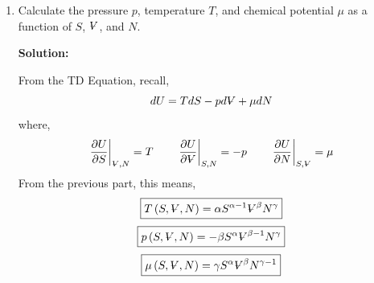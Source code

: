 \documentclass[10pt]{article}
\newenvironment{Solution}
    {\textbf{Solution:}
    
    \vspace{5mm}
    \begin{tcolorbox}
    }
    {
    \end{tcolorbox}
    \vspace{5mm}
    }
\newcommand{\vol}{{\ooalign{\hfil$V$\hfil\cr\kern0.08em--\hfil\cr}}}
\begin{document}
\begin{enumerate}
\begin{enumerate}
\begin{Solution}
    \begin{align}
    \frac{\partial U(S, \vol, N)}{\partial S}  &=  \alpha S^{\alpha-1} \vol^\beta N^\gamma \\
    \frac{\partial U(S, \vol, N)}{\partial \vol} &=  \beta S^{\alpha} \vol^{\beta-1} N^\gamma \\
    \frac{\partial U(S, \vol, N)}{\partial N} &= \gamma S^{\alpha} \vol^{\beta} N^{\gamma-1}
    \end{align}
    Substituting these back into \ref{extensive} we get,
    \begin{align}
    U(S, \vol, N)&= \alpha S^\alpha \vol^\beta N^\gamma  + \beta S^\alpha \vol^\beta N^\gamma  + \gamma S^\alpha \vol^\beta N^\gamma \\
    &=\left(\alpha + \beta + \gamma\right) S^\alpha \vol^\beta N^\gamma 
    \end{align}
    Form the problem statement, we know that $U \left(S,\vol,N\right) = {\left(S^\alpha \vol^\beta N^\gamma \right)}$ so,
    \begin{equation}
        \boxed{
        \left(\alpha + \beta + \gamma\right) = 1
        }
    \end{equation}
    \end{Solution}
    \item Calculate the pressure $p$, temperature 
    $T$, and chemical potential $\mu$ as a function of $S$, $\vol$, and $N$.
    
    \begin{Solution}
    From the TD Equation, recall, 
    \begin{equation}
        dU = T dS - p d\vol + \mu dN
    \end{equation}
    where, 
    \begin{equation}
        \left.\frac{\partial U}{\partial S}\right|_{\scriptsize{\vol}, N} = T \qquad \left.\frac{\partial U}{\partial \vol}\right|_{S, N} = -p \qquad \left.\frac{\partial U}{\partial N}\right|_{\scriptsize{S,\vol}} = \mu  
    \end{equation}
    From the previous part, this means, 
    \begin{equation}
        \boxed{
        T\left(S, \vol, N\right) = \alpha S^{\alpha-1} \vol^\beta N^\gamma
        }
    \end{equation}
    \begin{equation}
        \boxed{
        p\left(S, \vol, N\right) = -\beta S^{\alpha} \vol^{\beta-1} N^\gamma
        }
    \end{equation}
    \begin{equation}
        \boxed{
        \mu\left(S, \vol, N\right) = \gamma S^{\alpha} \vol^{\beta} N^{\gamma-1}
        }
    \end{equation}
    

\end{Solution}
\end{enumerate}
\end{enumerate}
\end{document}
